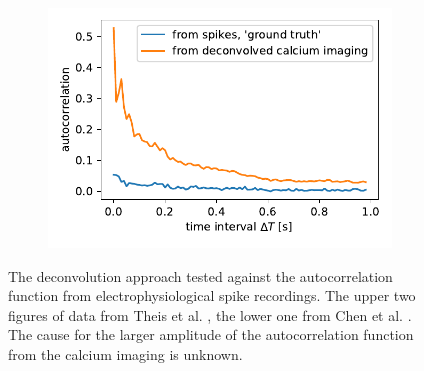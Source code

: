 \documentclass[12pt,a4paper,headinclude]{scrartcl}
\begin{document}
\begin{figure}
\begin{subfigure}{1\textwidth}
	\centering
	\includegraphics[width=0.5\linewidth]{./figures/comparison3.pdf}
\end{subfigure}%
\caption{The deconvolution approach tested against the autocorrelation function from electrophysiological spike recordings. The upper two figures of data from Theis et al. \cite{theis_benchmarking_2016}, the lower one from Chen et al. \cite{chen_ultrasensitive_2013}. The cause for the larger amplitude of the autocorrelation function from the calcium imaging is unknown.}
\label{fig:comparison_2p}
\end{figure}
\end{document}
